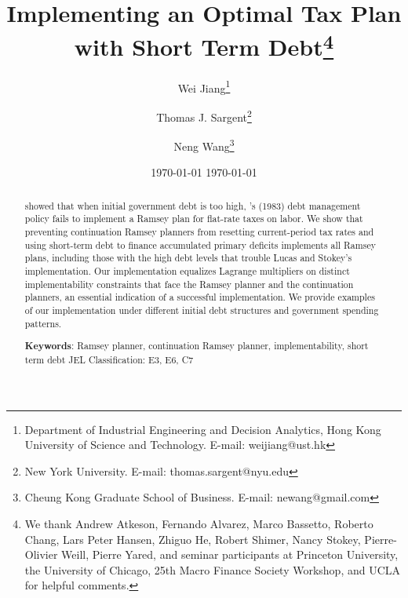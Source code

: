 \documentclass[12pt]{article}
\newcommand{\NW}[1]{{\textcolor{blue}{#1}}}
\begin{document}
	
	\date{%
		\today%
	} %
	\title{Implementing an Optimal Tax Plan with Short Term Debt\thanks{We thank Andrew Atkeson, Fernando Alvarez, Marco Bassetto, Roberto Chang, Lars Peter Hansen, Zhiguo He, Robert Shimer,  Nancy Stokey, Pierre-Olivier Weill, Pierre Yared, and seminar participants at  Princeton University, the University of Chicago, 25th Macro Finance Society Workshop, and UCLA for helpful comments.}}  %
\date{\today }
\author{	 Wei Jiang\thanks{%
Department of Industrial Engineering and Decision Analytics, Hong Kong University of Science and Technology. E-mail: weijiang@ust.hk } \and Thomas J. Sargent\thanks{New York University. E-mail: thomas.sargent@nyu.edu} \and Neng Wang\thanks{Cheung Kong Graduate School of Business. E-mail: {newang@gmail.com}} }

\maketitle



\begin{abstract}

  \citet*{debortoli2021optimal} showed that    when initial government debt is too high,  \citeauthor{LucasStokey1983}'s (1983) debt management policy fails to  implement a Ramsey plan for flat-rate taxes on labor.
       We show that  preventing continuation Ramsey planners from resetting current-period tax rates   and    using short-term debt to finance accumulated primary deficits implements all Ramsey plans, including  those with the high debt levels that trouble Lucas and Stokey's
 implementation. 
 Our  implementation  equalizes Lagrange multipliers on  distinct implementability constraints that  face the Ramsey planner and  the  continuation planners, an essential indication of a successful implementation. We provide examples of our implementation under  different initial debt structures and  government spending patterns.

\thispagestyle{empty}

\medskip

\noindent  \textbf{Keywords}: Ramsey planner, continuation Ramsey planner, implementability, short term debt  
\newline
\newline
JEL Classification: E3, E6, C7
\end{abstract}  
\end{document}
